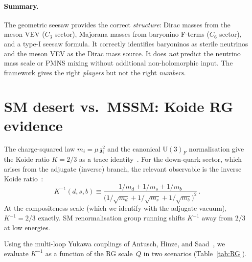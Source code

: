 \documentclass[aps,prd,twocolumn,showpacs,preprintnumbers,superscriptaddress,floatfix]{revtex4-2}
\newcommand{\UU}{\mathrm{U}}
\newcommand{\zch}{\mathfrak{z}}
\begin{document}
\paragraph{Summary.}
The geometric seesaw provides the correct \emph{structure}:
Dirac masses from the meson VEV ($C_3$ sector), Majorana masses
from baryonino F-terms ($C_6$ sector), and a type-I seesaw formula.
It correctly identifies baryoninos as sterile neutrinos and the
meson VEV as the Dirac mass source.
It does \emph{not} predict the neutrino mass scale or PMNS mixing
without additional non-holomorphic input.
The framework gives the right \emph{players} but not the right
\emph{numbers}.


\section{SM desert vs.\ MSSM: Koide RG evidence}
\label{sec:RG}

The charge-squared law $m_i = \mu\,\zch_i^2$ and the canonical
$\UU(3)_F$ normalisation give the Koide ratio $K = 2/3$ as a trace
identity~\cite{Rivero:2024epjc}.
For the down-quark sector, which arises from the adjugate (inverse)
branch, the relevant observable is the inverse Koide
ratio~\cite{Rivero:2024epjc}:
\begin{equation}
  K^{-1}(d,s,b) \equiv
  \frac{1/m_d + 1/m_s + 1/m_b}
       {\bigl(1/\sqrt{m_d} + 1/\sqrt{m_s} + 1/\sqrt{m_b}\bigr)^2}\,.
  \label{eq:Kinverse}
\end{equation}
At the compositeness scale (which we identify with the adjugate
vacuum), $K^{-1} = 2/3$ exactly.
SM renormalisation group running shifts $K^{-1}$ away from $2/3$
at low energies.

Using the multi-loop Yukawa couplings of Antusch, Hinze, and
Saad~\cite{AHS:2024}, we evaluate $K^{-1}$ as a function of the
RG scale~$Q$ in two scenarios (Table~\ref{tab:RG}).
\end{document}
